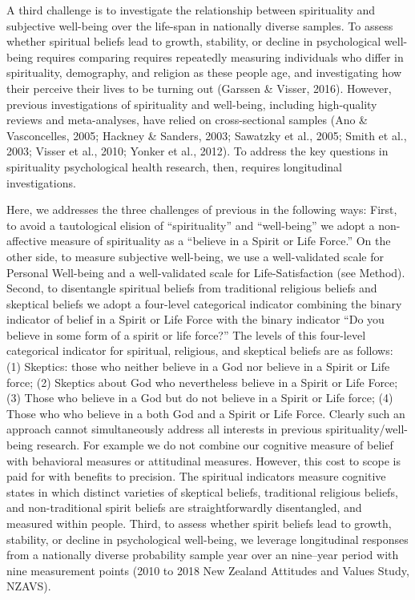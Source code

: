\documentclass[
  english,
  man]{apa6}
\begin{document}
A third challenge is to investigate the relationship between spirituality and subjective well-being over the life-span in nationally diverse samples. To assess whether spiritual beliefs lead to growth, stability, or decline in psychological well-being requires comparing requires repeatedly measuring individuals who differ in spirituality, demography, and religion as these people age, and investigating how their perceive their lives to be turning out (Garssen \& Visser, 2016). However, previous investigations of spirituality and well-being, including high-quality reviews and meta-analyses, have relied on cross-sectional samples (Ano \& Vasconcelles, 2005; Hackney \& Sanders, 2003; Sawatzky et al., 2005; Smith et al., 2003; Visser et al., 2010; Yonker et al., 2012). To address the key questions in spirituality psychological health research, then, requires longitudinal investigations.

Here, we addresses the three challenges of previous in the following ways: First, to avoid a tautological elision of \enquote{spirituality} and \enquote{well-being} we adopt a non-affective measure of spirituality as a \enquote{believe in a Spirit or Life Force.} On the other side, to measure subjective well-being, we use a well-validated scale for Personal Well-being and a well-validated scale for Life-Satisfaction (see Method). Second, to disentangle spiritual beliefs from traditional religious beliefs and skeptical beliefs we adopt a four-level categorical indicator combining the binary indicator of belief in a Spirit or Life Force with the binary indicator \enquote{Do you believe in some form of a spirit or life force?} The levels of this four-level categorical indicator for spiritual, religious, and skeptical beliefs are as follows: (1) Skeptics: those who neither believe in a God nor believe in a Spirit or Life force; (2) Skeptics about God who nevertheless believe in a Spirit or Life Force; (3) Those who believe in a God but do not believe in a Spirit or Life force; (4) Those who who believe in a both God and a Spirit or Life Force. Clearly such an approach cannot simultaneously address all interests in previous spirituality/well-being research. For example we do not combine our cognitive measure of belief with behavioral measures or attitudinal measures. However, this cost to scope is paid for with benefits to precision. The spiritual indicators measure cognitive states in which distinct varieties of skeptical beliefs, traditional religious beliefs, and non-traditional spirit beliefs are straightforwardly disentangled, and measured within people. Third, to assess whether spirit beliefs lead to growth, stability, or decline in psychological well-being, we leverage longitudinal responses from a nationally diverse probability sample year over an nine--year period with nine measurement points (2010 to 2018 New Zealand Attitudes and Values Study, NZAVS).
\end{document}
